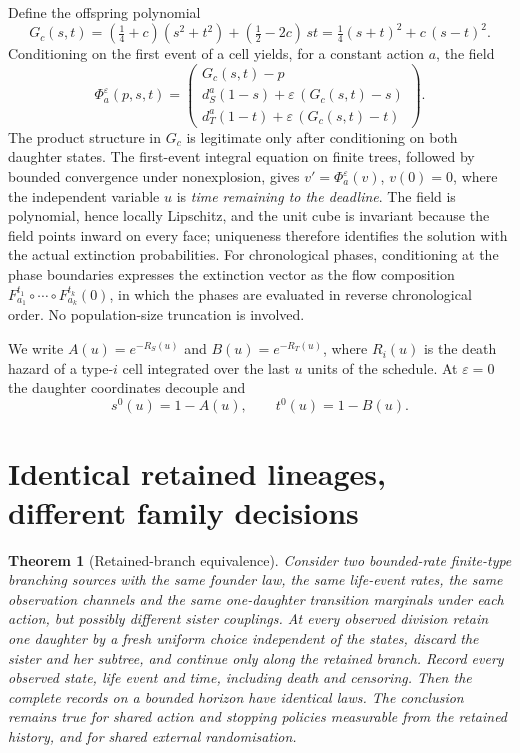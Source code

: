 \documentclass[11pt]{article}
\theoremstyle{plain}
\newtheorem{theorem}{Theorem}
\theoremstyle{definition}
\theoremstyle{remark}
\newcommand{\eps}{\varepsilon}
\begin{document}
Define the offspring polynomial
\begin{equation}\label{eq:G}
 G_c(s,t)=(\tfrac14+c)(s^2+t^2)+(\tfrac12-2c)\,st
 =\tfrac14(s+t)^2+c\,(s-t)^2 .
\end{equation}
Conditioning on the first event of a cell yields, for a constant action $a$,
the field
\begin{equation}\label{eq:field}
 \Phi_a^\eps(p,s,t)=\begin{pmatrix}
 G_c(s,t)-p\\
 d_S^a(1-s)+\eps\,(G_c(s,t)-s)\\
 d_T^a(1-t)+\eps\,(G_c(s,t)-t)\end{pmatrix}.
\end{equation}
The product structure in $G_c$ is legitimate only after conditioning on both
daughter states. The first-event integral equation on finite trees, followed by
bounded convergence under nonexplosion, gives $v'=\Phi_a^\eps(v)$, $v(0)=0$,
where the independent variable $u$ is \emph{time remaining to the deadline}.
The field is polynomial, hence locally Lipschitz, and the unit cube is
invariant because the field points inward on every face; uniqueness therefore
identifies the solution with the actual extinction probabilities. For
chronological phases, conditioning at the phase boundaries expresses the
extinction vector as the flow composition $F^{t_1}_{a_1}\circ\cdots\circ
F^{t_k}_{a_k}(0)$, in which the phases are evaluated in reverse chronological
order. No population-size truncation is involved.

We write $A(u)=e^{-R_S(u)}$ and $B(u)=e^{-R_T(u)}$, where $R_i(u)$ is the death
hazard of a type-$i$ cell integrated over the last $u$ units of the schedule.
At $\eps=0$ the daughter coordinates decouple and
\begin{equation}\label{eq:s0t0}
 s^0(u)=1-A(u),\qquad t^0(u)=1-B(u).
\end{equation}

\section{Identical retained lineages, different family decisions}

\begin{theorem}[Retained-branch equivalence]\label{thm:branch}
Consider two bounded-rate finite-type branching sources with the same founder
law, the same life-event rates, the same observation channels and the same
one-daughter transition marginals under each action, but possibly different
sister couplings. At every observed division retain one daughter by a fresh
uniform choice independent of the states, discard the sister and her subtree,
and continue only along the retained branch. Record every observed state, life
event and time, including death and censoring. Then the complete records on a
bounded horizon have identical laws. The conclusion remains true for shared
action and stopping policies measurable from the retained history, and for
shared external randomisation.
\end{theorem}
\end{document}
